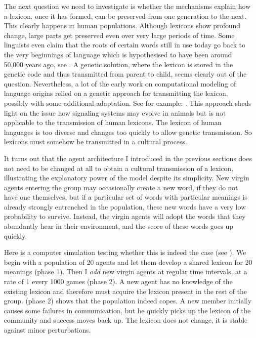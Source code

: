 The next question we need to investigate
is whether the mechanisms 
explain how a lexicon, once it has formed, can 
be preserved from one generation to the next. This clearly 
happens in human populations. Although lexicons show
profound change, large parts get preserved even over 
very large periods of time. 
Some linguists even claim that the roots of certain 
words still in use today go back to the very beginnings
of language which is hypothesised to 
have been around 50,000 
years ago, see \cite{Ruhlen:1994}. 
A genetic solution, where the lexicon is stored in the genetic 
code and thus transmitted from parent to child, seems clearly 
out of the question. Nevertheless, a lot of the 
early work on computational modeling
of language origins relied on a genetic approach 
for transmitting the lexicon, possibly with some
additional adaptation. See for example: \cite[603--631]{MacLennan:1991}.
This approach sheds light on the issue how signaling
systems may evolve in animals but is not applicable
to the transmission of human lexicons. The lexicon of human languages 
is too diverse and changes too quickly to allow genetic
transmission. So lexicons must somehow be transmitted 
in a cultural process.

It turns out that the agent architecture I introduced
in the previous sections does not 
need to be changed at all to obtain a cultural 
transmission of a lexicon, illustrating the explanatory 
power of the model despite its simplicity. New virgin agents
entering the group may occasionally create a new word, 
if they do not have one themselves, but if a 
particular set of words with particular meanings
is already strongly entrenched in the population, these
new words have a very low probability to survive.
Instead, the virgin agents will adopt the words
that they abundantly hear in their environment, and the
score of these words goes up quickly. 

Here is a computer simulation testing whether this 
is indeed the case (see ). 
We begin with a population of 20 agents and let them develop a 
shared lexicon for 20 meanings (phase 1). Then I {\itshape add}
new virgin agents at regular time intervals, at a rate 
of 1 every 1000 games (phase 2). A new 
agent has no knowledge of the existing lexicon and
therefore must acquire the lexicon present in the rest
of the group.  (phase 2) shows that the 
population indeed copes. A new member initially causes 
some failures in communication, but he quickly
picks up the lexicon of the community and success
moves back up. The lexicon does not change, it is 
stable against minor perturbations. 


